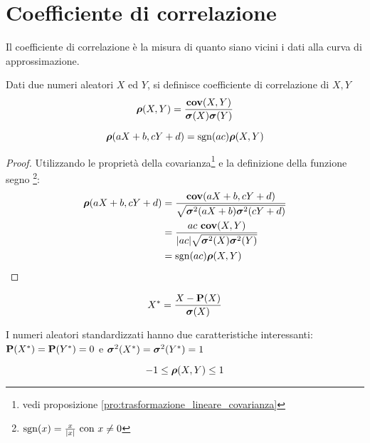
\section{Coefficiente di correlazione} %
Il coefficiente di correlazione è la misura di quanto siano vicini i dati alla curva di approssimazione.

\begin{definition}
  Dati due numeri aleatori $X$ ed $Y$, si definisce coefficiente di correlazione di $X,Y$
  \[ \boldsymbol\rho(X,Y) = \frac{\mathbf{cov}(X,Y)}{\boldsymbol\sigma(X)\boldsymbol\sigma(Y)} \]
\end{definition}

\begin{proposition}
  \[ \boldsymbol\rho(aX + b, cY + d) = \operatorname{sgn}(ac) \boldsymbol\rho(X,Y) \]
\end{proposition}

\begin{proof}
  Utilizzando le proprietà della covarianza\footnote{vedi proposizione \ref{pro:trasformazione_lineare_covarianza}} e la definizione della funzione segno
  \footnote{\( \operatorname{sgn}(x) = \frac{x}{|x|} \mbox{~con~} x \ne 0 \)}:
  \begin{align*}
    \boldsymbol\rho(aX + b, cY + d) &= \frac{\mathbf{cov}(aX + b, cY + d)}{\sqrt{\boldsymbol\sigma^2(aX + b) \boldsymbol\sigma^2(cY + d)}} \\
    &= \frac{ac ~ \mathbf{cov}(X,Y)}{|ac| \sqrt{\boldsymbol\sigma^2(X) \boldsymbol\sigma^2(Y)}} \\
    &= \operatorname{sgn}(ac) \boldsymbol\rho(X,Y)
  \end{align*}
\end{proof}

\begin{definition}
  \[ X^* = \frac{X - \mathbf{P}(X)}{\boldsymbol\sigma(X)} \]
\end{definition}
I numeri aleatori standardizzati hanno due caratteristiche interessanti: \( \mathbf{P}(X^*) = \mathbf{P}(Y^*) = 0 \) e \( \boldsymbol\sigma^2(X^*) = \boldsymbol\sigma^2(Y^*) = 1 \)

\begin{proposition}
  \[ -1 \le \boldsymbol\rho(X,Y) \le 1 \]
\end{proposition}

